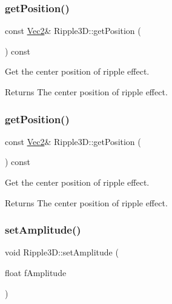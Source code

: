 \subsubsection{\texorpdfstring{get\+Position()}{getPosition()}\hspace{0.1cm}{\footnotesize\ttfamily [1/2]}}
{\footnotesize\ttfamily const \hyperlink{classVec2}{Vec2}\& Ripple3\+D\+::get\+Position (\begin{DoxyParamCaption}{ }\end{DoxyParamCaption}) const\hspace{0.3cm}{\ttfamily [inline]}}



Get the center position of ripple effect. 

\begin{DoxyReturn}{Returns}
The center position of ripple effect. 
\end{DoxyReturn}
\mbox{\label{classRipple3D_aea226ed8d1d72fa88cd5643a75c5e404}} 
\subsubsection{\texorpdfstring{get\+Position()}{getPosition()}\hspace{0.1cm}{\footnotesize\ttfamily [2/2]}}
{\footnotesize\ttfamily const \hyperlink{classVec2}{Vec2}\& Ripple3\+D\+::get\+Position (\begin{DoxyParamCaption}{ }\end{DoxyParamCaption}) const\hspace{0.3cm}{\ttfamily [inline]}}



Get the center position of ripple effect. 

\begin{DoxyReturn}{Returns}
The center position of ripple effect. 
\end{DoxyReturn}
\mbox{\label{classRipple3D_ad31bc9587e1562638c3ce843376fb68b}} 
\subsubsection{\texorpdfstring{set\+Amplitude()}{setAmplitude()}\hspace{0.1cm}{\footnotesize\ttfamily [1/2]}}
{\footnotesize\ttfamily void Ripple3\+D\+::set\+Amplitude (\begin{DoxyParamCaption}\item[{float}]{f\+Amplitude }\end{DoxyParamCaption})\hspace{0.3cm}{\ttfamily [inline]}}



